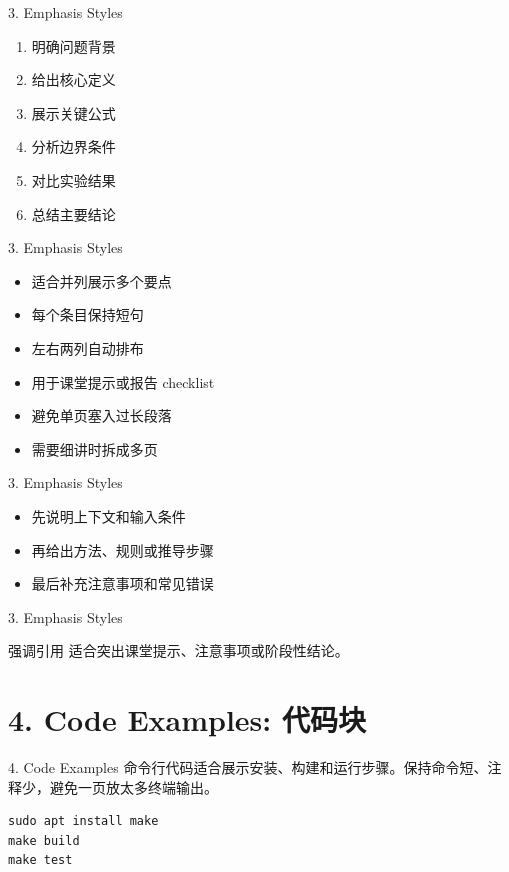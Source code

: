 \documentclass[red,tutorial,sectionpages]{vsp-beamer}
\begin{document}
\begin{frame}{3. Emphasis Styles}
\begin{enumerate}
\def\labelenumi{\arabic{enumi}.}
\item
  明确问题背景
\item
  给出核心定义
\item
  展示关键公式
\item
  分析边界条件
\item
  对比实验结果
\item
  总结主要结论
\end{enumerate}
\end{frame}

\begin{frame}{3. Emphasis Styles}
\begin{itemize}
\item
  适合并列展示多个要点
\item
  每个条目保持短句
\item
  左右两列自动排布
\item
  用于课堂提示或报告 checklist
\item
  避免单页塞入过长段落
\item
  需要细讲时拆成多页
\end{itemize}
\end{frame}

\begin{frame}{3. Emphasis Styles}
\begin{itemize}
\item
  先说明上下文和输入条件
\item
  再给出方法、规则或推导步骤
\item
  最后补充注意事项和常见错误
\end{itemize}
\end{frame}

\begin{frame}[t]{3. Emphasis Styles}
\begin{vspquote}{强调引用}
适合突出课堂提示、注意事项或阶段性结论。
\end{vspquote}
\end{frame}

\section{4. Code Examples: 代码块}

\begin{frame}[fragile]{4. Code Examples}
命令行代码适合展示安装、构建和运行步骤。保持命令短、注释少，避免一页放太多终端输出。

\begin{verbatim}
sudo apt install make
make build
make test
\end{verbatim}
\end{frame}
\end{document}
